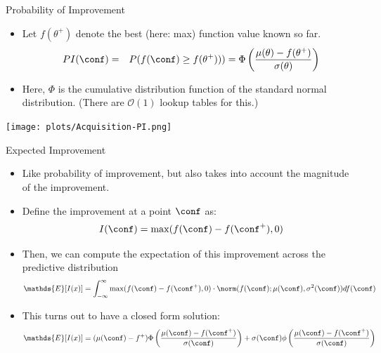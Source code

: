 \begin{frame}[c,fragile]{Probability of Improvement}
\begin{itemize}
\vspace*{-0.2cm}
  \item Let $f(\theta^+)$ denote the best (here: max) function value known so far.
\vspace*{-0.2cm}  
  \begin{eqnarray}
\nonumber{}  PI(\conf) & = & P(f(\conf) \ge f(\theta^+))) = \Phi \left( \frac{\mu(\theta) - f(\theta^+)}{\sigma(\theta)} \right)
  \end{eqnarray}
  \item Here, $\Phi$ is the cumulative distribution function of the standard normal distribution. (There are $\mathcal{O}(1)$ lookup tables for this.)
\end{itemize}
\centering
\texttt{[image: plots/Acquisition-PI.png]} 

\end{frame}

\begin{frame}[c,fragile]{Expected Improvement}

\begin{itemize}
\vspace*{-0.2cm}
  \item Like probability of improvement, but also takes into account the \alert{magnitude} of the improvement.
  \item Define the improvement at a point $\conf$ as:\\
\vspace*{-0.2cm}
  \begin{equation}
  \nonumber{}I(\conf) = \max (f(\conf) - f(\conf^+), 0)
  \end{equation}
  \mypause
\vspace*{-0.4cm}  
  \item Then, we can compute the expectation of this improvement across the predictive distribution
  \begin{eqnarray}
\nonumber{} \mathds{E}[I(x)] = \int_{-\infty}^{\infty} \max (f(\conf) - f(\conf^+), 0) \cdot \norm( f(\conf) ; \mu(\conf), \sigma^2(\conf) )  df(\conf) 
  \end{eqnarray}
  \mypause
\vspace*{-0.2cm}
  \item This turns out to have a closed form solution:
  \small
  \begin{eqnarray}
\nonumber{} \mathds{E}[I(x)] = (\mu(\conf) - f^+) \Phi\left( \frac{\mu(\conf) - f(\conf^+)}{\sigma(\conf)} \right)  + \sigma(\conf) \phi \left( \frac{\mu(\conf) - f(\conf^+)}{\sigma(\conf)} \right)
  \end{eqnarray}
\end{itemize}

\end{frame}


